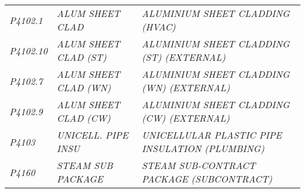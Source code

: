 \begin{landscape}
\begin{longtable}[l]{l%
                  l|%
                  l|}
\itshape P4102.1     &\itshape ALUM SHEET CLAD        &\itshape ALUMINIUM SHEET CLADDING (HVAC)   \\
\itshape P4102.10    &\itshape ALUM SHEET CLAD (ST)   &\itshape ALUMINIUM SHEET CLADDING (ST) (EXTERNAL)   \\
\itshape P4102.7     &\itshape ALUM SHEET CLAD (WN)   &\itshape ALUMINIUM SHEET CLADDING (WN) (EXTERNAL)   \\
\itshape P4102.9     &\itshape ALUM SHEET CLAD (CW)   &\itshape ALUMINIUM SHEET CLADDING (CW) (EXTERNAL)   \\
\itshape P4103       &\itshape UNICELL. PIPE INSU     &\itshape UNICELLULAR PLASTIC PIPE INSULATION (PLUMBING)   \\
\itshape P4160       &\itshape STEAM SUB PACKAGE      &\itshape STEAM SUB-CONTRACT PACKAGE (SUBCONTRACT)   \\
\bottomrule
\end{longtable}%
\egroup
\end{landscape}%
